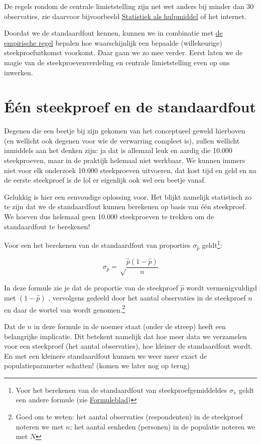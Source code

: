 \documentclass[
  letterpaper,
  DIV=11,
  numbers=noendperiod]{scrreprt}
\begin{document}
De regels rondom de centrale limietstelling zijn net wet anders bij
minder dan 30 observaties, zie daarvoor bijvoorbeeld
\href{https://www.uitgeverijvangorcum.nl/product/100-519_Statistiek-als-hulpmiddel}{Statistiek
als hulpmiddel} of het internet.

Doordat we de standaardfout kennen, kunnen we in combinatie met
\hyperref[sec-normaleverdeling]{de empirische regel} bepalen hoe
waarschijnlijk een bepaalde (willekeurige) steekproefuitkomst voorkomt.
Daar gaan we zo mee verder. Eerst laten we de magie van de
steekproevenverdeling en centrale limietstelling even op ons inwerken.

\section{Één steekproef en de standaardfout}\label{sec-standaardfout}

Degenen die een beetje bij zijn gekomen van het conceptueel geweld
hierboven (en wellicht ook degenen voor wie de verwarring compleet is),
zullen wellicht inmiddels aan het denken zijn: ja dat is allemaal leuk
en aardig die 10.000 steekproeven, maar in de praktijk helemaal niet
werkbaar. We kunnen immers niet voor elk onderzoek 10.000 steekproeven
uitvoeren, dat kost tijd en geld en na de eerste steekproef is de lol er
eigenlijk ook wel een beetje vanaf.

Gelukkig is hier een eenvoudige oplossing voor. Het blijkt namelijk
statistisch zo te zijn dat we de standaardfout kunnen berekenen op basis
van één steekproef. We hoeven dus helemaal geen 10.000 steekproeven te
trekken om de standaardfout te berekenen!

Voor een het berekenen van de standaardfout van proporties
\(\sigma_{\hat{p}}\) geldt\footnote{Voor het berekenen van de
  standaardfout van steekproefgemiddeldes \(\sigma_{\bar{x}}\) geldt een
  andere formule (zie \href{formuleblad.qmd}{Formuleblad})}:

\[\sigma_{\hat{p}}=\sqrt\frac{\hat{p}(1-\hat{p})}{n}\]

In deze formule zie je dat de proportie van de steekproef \(\hat{p}\)
wordt vermenigvuldigd met \((1-\hat{p})\) , vervolgens gedeeld door het
aantal observaties in de steekproef \(n\) en daar de wortel van wordt
genomen.\footnote{Goed om te weten: het aantal observaties
  (respondenten) in de steekproef noteren we met \(n\); het aantal
  eenheden (personen) in de populatie noteren we met \(N\)}

Dat de \(n\) in deze formule in de noemer staat (onder de streep) heeft
een belangrijke implicatie. Dit betekent namelijk dat hoe meer data we
verzamelen voor een steekproef (het aantal observaties), hoe kleiner de
standaardfout wordt. En met een kleinere standaardfout kunnen we weer
meer exact de populatieparameter schatten! (komen we later nog op terug)
\end{document}
